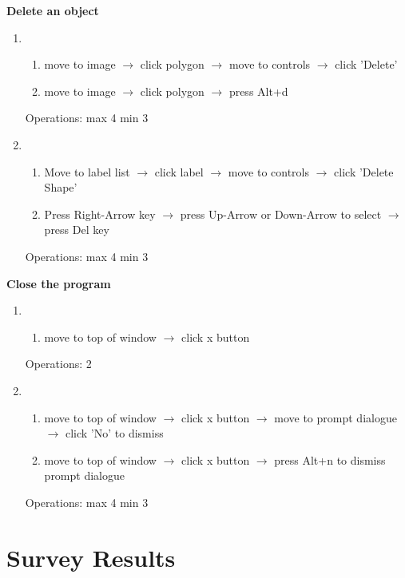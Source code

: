 \documentclass[a4paper,11pt,oneside]{article}
\begin{document}
{\bf Delete an object}
\begin{enumerate}
    \item
    \begin{enumerate}
        \item move to image $\rightarrow$ click polygon $\rightarrow$ move to controls $\rightarrow$ click 'Delete'
        \item move to image $\rightarrow$ click polygon $\rightarrow$ press Alt+d
    \end{enumerate}
    Operations: max 4 min 3
    \item
    \begin{enumerate}
        \item Move to label list $\rightarrow$ click label $\rightarrow$ move to controls $\rightarrow$ click 'Delete Shape'
        \item Press Right-Arrow key $\rightarrow$ press Up-Arrow or Down-Arrow to select $\rightarrow$ press Del key
    \end{enumerate}
    Operations: max 4 min 3
\end{enumerate}

{\bf Close the program}
\begin{enumerate}
    \item
    \begin{enumerate}
        \item move to top of window $\rightarrow$ click x button
    \end{enumerate}
    Operations: 2
    \item
    \begin{enumerate}
        \item move to top of window $\rightarrow$ click x button $\rightarrow$ move to prompt dialogue $\rightarrow$ click 'No' to dismiss
        \item move to top of window $\rightarrow$ click x button $\rightarrow$ press Alt+n to dismiss prompt dialogue
    \end{enumerate}
    Operations: max 4 min 3
\end{enumerate}

\section{Survey Results}
\label{sec:survey}
\end{document}
